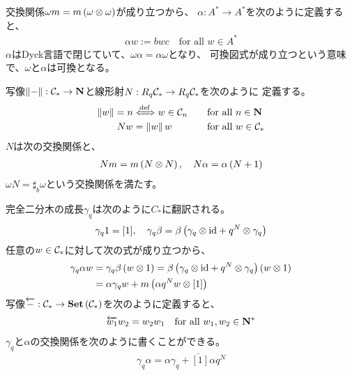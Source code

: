{	交換関係$\omega m=m\left({\omega\otimes\omega}\right)$が成り立つから、
	$\alpha:A^*\to A^*$を次のように定義すると、
	\begin{equation*}\begin{split}
		\alpha w := bwc \quad\text{for all } w\in A^*
	\end{split}\end{equation*}
	$\alpha$はDyck言語で閉じていて、$\omega\alpha=\alpha\omega$となり、
	可換図式が成り立つという意味で、$\omega$と$\alpha$は可換となる。

	写像$\left\lVert{-}\right\rVert:{{\mathcal{C}}}_*\to\mathbf{N}$と線形射$N:R_q{{\mathcal{C}}}_*\to R_q{{\mathcal{C}}}_*$を次のように
	定義する。
	\begin{alignat*}{2}
		\dabs{w} = n &\xiff{\dfn} w\in \C_n 
			&\quad& \text{for all } n\in\sizen \\
		Nw &= \dabs{w}w &\quad& \text{for all } w\in\C_*
	\end{alignat*}
	$N$は次の交換関係と、
	\begin{equation*}\begin{split}
		Nm = m\left({N\otimes N}\right),\quad N\alpha = \alpha\left({N + 1}\right)
	\end{split}\end{equation*}
	$\omega N=\sharp_b\omega$という交換関係を満たす。

	完全二分木の成長$\gamma_q$は次のように$C_*$に翻訳される。
	\begin{equation*}\begin{split}
		\gamma_q1 = [1],\quad
		\gamma_q\beta = \beta\left({\gamma_q\otimes{\ensuremath{\operatorname{id}}} + q^N\otimes\gamma_q}\right)
	\end{split}\end{equation*}
	任意の$w\in{\ensuremath{{\mathcal{C}}}}_*$に対して次の式が成り立つから、
	\begin{equation*}\begin{split}
		\gamma_q\alpha w &= \gamma_q\beta\left({w\otimes1}\right)
		= \beta\left({\gamma_q\otimes{\ensuremath{\operatorname{id}}} + q^N\otimes\gamma_q}\right)\left({w\otimes1}\right) \\
		&= \alpha\gamma_qw + m\left({\alpha q^N w\otimes[1]}\right)
	\end{split}\end{equation*}
	写像$\overleftarrow{-}:{{\mathcal{C}}}_*\to{\ensuremath{\mathbf{{Set}}}}\left({{{\mathcal{C}}}_*}\right)$を次のように定義すると、
	\begin{equation*}\begin{split}
		\overleftarrow{w_1}w_2 = w_2w_1 \quad\text{for all } w_1,w_2\in\mathbf{N}^*
	\end{split}\end{equation*}
	$\gamma_q$と$\alpha$の交換関係を次のように書くことができる。
	\begin{equation*}\begin{split}
		\gamma_q\alpha = \alpha\gamma_q + \lvec{[1]}\alpha q^N
	\end{split}\end{equation*}

}
